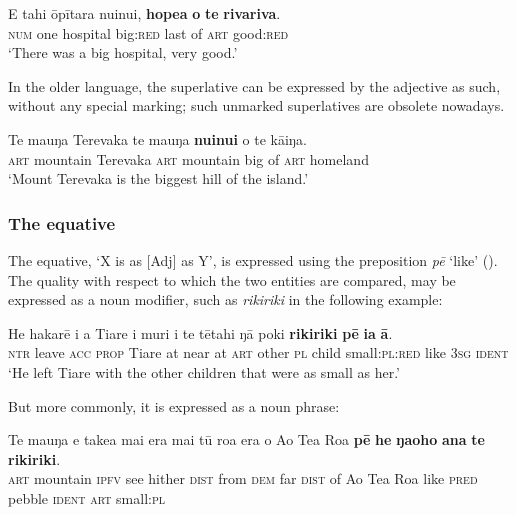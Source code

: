 \ea\label{ex:3.121}
\gll E tahi {\ꞌ}ōpītara nuinui, \textbf{hope{\ꞌ}a} \textbf{o} \textbf{te} \textbf{rivariva}. \\
\textsc{num} one hospital big:\textsc{red} last of \textsc{art} good:\textsc{red} \\

\glt 
‘There was a big hospital, very good.’ \textstyleExampleref{[R239.055]} 
\z

In the older language, the superlative can be expressed by the adjective as such, without any special marking; such unmarked superlatives are obsolete nowadays.

\ea\label{ex:3.122}
\gll Te ma{\ꞌ}uŋa Terevaka te ma{\ꞌ}uŋa \textbf{nuinui} o te kāiŋa. \\
\textsc{art} mountain Terevaka \textsc{art} mountain big of \textsc{art} homeland \\

\glt 
‘Mount Terevaka is the biggest hill of the island.’ 
\z

\subsubsection[The equative]{The equative}\label{sec:3.5.2.3}

The equative, ‘X is as [Adj] as Y’, is expressed using the preposition \textit{pē} ‘like’ (). The quality with respect to which the two entities are compared, may be expressed as a noun modifier, such as \textit{rikiriki} in the following example:

\ea\label{ex:3.123}
\gll He hakarē i a Tiare {\ꞌ}i muri i te tētahi ŋā poki \textbf{rikiriki} \textbf{pē} \textbf{ia} \textbf{{\ꞌ}ā}. \\
\textsc{ntr} leave \textsc{acc} \textsc{prop} Tiare at near at \textsc{art} other \textsc{pl} child small:\textsc{pl}:\textsc{red} like \textsc{3sg} \textsc{ident} \\

\glt
‘He left Tiare with the other children that were as small as her.’ \textstyleExampleref{[R481.034]} 
\z

But more commonly, it is expressed as a noun phrase:

\ea\label{ex:3.124}
\gll Te ma{\ꞌ}uŋa e take{\ꞌ}a mai era mai tū roa era o Ao Tea Roa  \textbf{pē} \textbf{he} \textbf{ŋa{\ꞌ}oho} \textbf{{\ꞌ}ana} \textbf{te} \textbf{rikiriki}.\\
\textsc{art} mountain \textsc{ipfv} see hither \textsc{dist} from \textsc{dem} far \textsc{dist} of Ao Tea Roa  like \textsc{pred} pebble \textsc{ident} \textsc{art} small:\textsc{pl}\\

